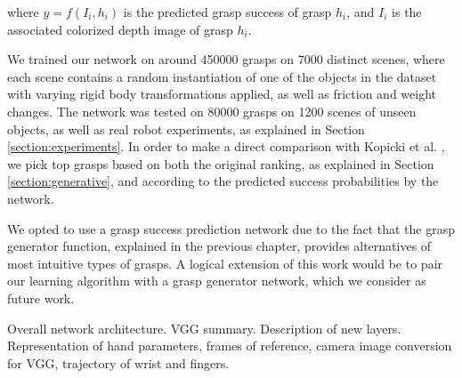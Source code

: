 where $y = f(I_i, h_i)$ is the predicted grasp success of grasp $h_i$, and $I_i$ is the associated colorized depth image of grasp $h_i$.

We trained our network on around 450000 grasps on 7000 distinct scenes, where each scene contains a random instantiation of one of the objects in the dataset with varying rigid body transformations applied, as well as friction and weight changes. The network was tested on 80000 grasps on 1200 scenes of unseen objects, as well as real robot experiments, as explained in Section \ref{section:experiments}. In order to make a direct comparison with Kopicki et al. \cite{kopicki2015ijrr}, we pick top grasps based on both the original ranking, as explained in Section \ref{section:generative}, and according to the predicted success probabilities by the network. 

We opted to use a grasp success prediction network due to the fact that the grasp generator function, explained in the previous chapter, provides alternatives of most intuitive types of grasps. A logical extension of this work would be to pair our learning algorithm with a grasp generator network, which we consider as future work.

Overall network architecture. VGG summary. Description of new layers. Representation of hand parameters, frames of reference, camera image conversion for VGG, trajectory of wrist and fingers.